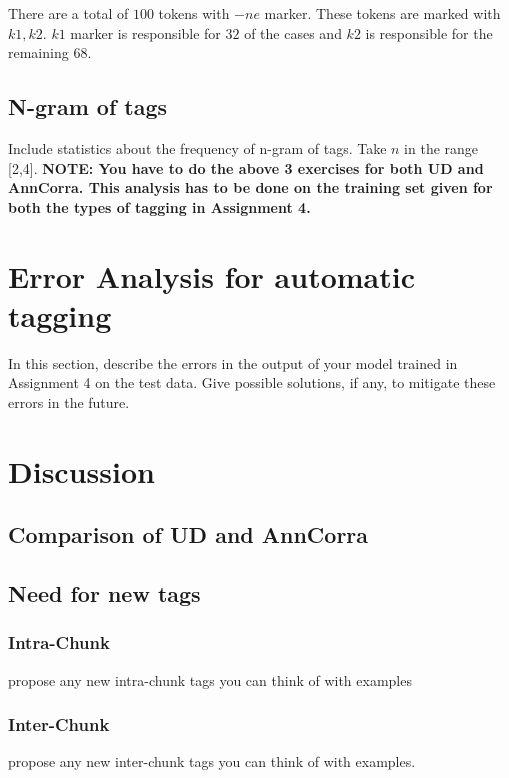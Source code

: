 \documentclass[a4 paper]{article}
\begin{document}
There are a total of $100$ tokens with $-ne$ marker. These tokens are marked with $k1, k2$. $k1$ marker is responsible for $32$ of the cases and $k2$ is responsible for the remaining $68$.

\subsection{N-gram of tags}
Include statistics about the frequency of n-gram of tags. Take $n$ in the range [2,4].
\newline \newline \newline
\textbf{NOTE: You have to do the above 3 exercises for both UD and AnnCorra. This analysis has to be done on the training set given for both the types of tagging in Assignment 4.}

\section{Error Analysis for automatic tagging}
In this section, describe the errors in the output of your model trained in Assignment 4 on the test data. Give possible solutions, if any, to mitigate these errors in the future. 

\section{Discussion}

\subsection{Comparison of UD and AnnCorra}
\subsection{Need for new tags}
\subsubsection{Intra-Chunk}
propose any new intra-chunk tags you can think of with examples
\subsubsection{Inter-Chunk}
propose any new inter-chunk tags you can think of with examples.
\end{document}
